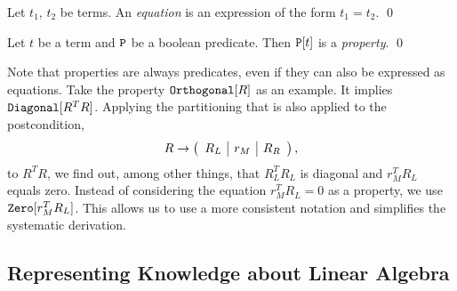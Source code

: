 \begin{definition}[Equations]
Let $t_1$, $t_2$ be terms. An \emph{equation} is an expression of the form $t_1 = t_2$. \qed
\end{definition}

\begin{definition}[Properties]
Let $t$ be a term and $\text{\ttfamily P}$ be a boolean predicate. Then $\text{\ttfamily P}[t]$ is a \emph{property}. \qed
\end{definition}

Note that properties are always predicates, even if they can also be expressed as equations. Take the property $\text{\ttfamily Orthogonal}[R]$ as an example. It implies $\text{\ttfamily Diagonal}[R^T R]$. Applying the partitioning that is also applied to the postcondition,
%
$$R \rightarrow \myFlaOneByThree{R_L}{r_M}{R_R}\text{,}$$
%
to $R^T R$, we find out, among other things, that $R_L^T R_L$ is diagonal and $r_M^T R_L$ equals zero. 
Instead of considering the equation $r_M^T R_L = 0$ as a property, we use $\text{\ttfamily Zero}[r_M^T R_L]$. This allows us to use a more consistent notation and simplifies the systematic derivation.

%

\subsection{Representing Knowledge about Linear Algebra}

